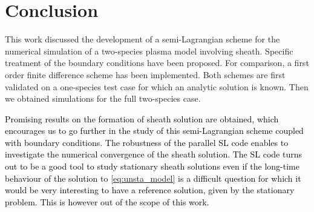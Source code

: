\documentclass{article}
\numberwithin{equation}{section}
\begin{document}
\section{Conclusion}

This work discussed the development of a semi-Lagrangian scheme for the numerical simulation of a two-species plasma model involving sheath. Specific treatment of the boundary conditions have been proposed. For comparison, a first order finite difference scheme has been implemented. Both schemes are first validated on a one-species test case for which an analytic solution is known. Then we obtained simulations for the full two-species case. 

\textcolor{black}{
Promising results on the formation of sheath solution are obtained, 
which encourages us  to go further in the study of this semi-Lagrangian scheme coupled with boundary conditions. 
The robustness of the parallel SL code enables to investigate the numerical convergence of the sheath solution. 
The SL code turns out to be a good tool to study stationary sheath solutions even if the long-time behaviour 
of the solution to \eqref{eq:unsta_model} is a difficult question for which it would be very interesting to have a reference solution, given by the stationary problem. This is however out of the scope of this work.}







\end{document}

